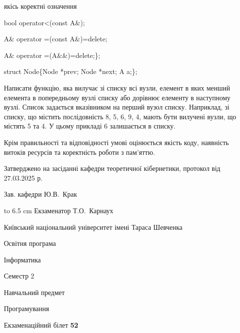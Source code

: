 \documentclass[12pt, ukrainian]{article}
\begin{document}
{\quad  якісь коректні означення 

\quad  bool operator<(const A\&); 

\quad A\& operator =(const A\&)=delete; 

\quad  A\& operator =(A\&\&)=delete;\};

struct Node\{Node *prev; Node *next; A a;\};

Написати функцію, яка вилучає зі списку всі вузли, елемент в яких менший елемента в попередньому вузлі списку або дорівнює елементу в наступному вузлі. Список задається вказівником на перший вузол списку. Наприклад, зі списку, що містить послідовність 8, 5, 6, 9, 4, мають бути вилучені вузли, що містять 5 та 4. У цьому прикладі 6 залишається в списку.

Крім правильності та відповідності умові оцінюється якість коду, наявність витоків ресурсів та коректність роботи з пам'яттю. 

}
{\smallskip\smallskip \begin {scriptsize} Затверджено на засіданні кафедри теоретичної кібернетики, протокол   від   27.03.2025 р.\par\smallskip\smallskip\smallskip\smallskip
{\parbox {6.5 cm} {Зав. кафедри \dotfill Ю.В.~Крак}}\hspace {0.7cm} {\hbox to 6.5 cm { Екзаменатор \dotfill Т.О.~Карнаух}} \end{scriptsize}}
\newpage
{{\begin {scriptsize}\par
{ \center  Київський національний університет імені Тараса Шевченка \par}
{\parbox {5 cm}{Освітня програма \hfill}{\parbox {7 cm}{Інформатика\hfill}}\parbox {6 cm}{\hfill Семестр 2}}\par
{\parbox {5 cm} {Навчальний предмет \hfill}\parbox {7 cm}{Програмування \hfill}\parbox {6cm}{\hfill}\par}\vspace{-15pt} \end{scriptsize}}{\center Екзаменаційний білет \No \textbf { 52 }\par}}
\end{document}
